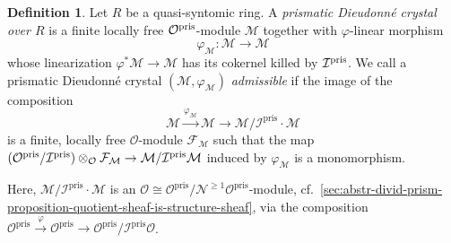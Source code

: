 \documentclass{amsart}
\theoremstyle{plain}
\theoremstyle{definition}
\newtheorem{definition}[theorem]{Definition}
\newcommand{\pris}{\mathrm{pris}}
\newcommand{\red}[1]{{\color{black} #1}}
\begin{document}
\begin{definition}
  \label{sec:abstr-divid-prism-definition-prismatic-dieudonne-crystals}
  Let $R$ be a quasi-syntomic ring. A \textit{prismatic Dieudonn\'e crystal over $R$} is a finite locally free $\mathcal{O}^{\rm pris}$-module $\mathcal{M}$ together with $\varphi$-linear morphism
  $$
  \varphi_{\mathcal{M}} \colon  \mathcal{M}\to \mathcal{M}
  $$
  whose linearization \red{$\varphi^\ast \mathcal{M}\to \mathcal{M}$} has its cokernel killed by $\mathcal{I}^{\rm pris}$. \red{We call a prismatic Dieudonn\'e crystal $(\mathcal{M},\varphi_{\mathcal{M}})$ \textit{admissible} if the image of the composition
    \[
      \mathcal{M}\xrightarrow{\varphi_{\mathcal{M}}} \mathcal{M}\to \mathcal{M}/\mathcal{I}^\pris\cdot \mathcal{M}
    \]
    is a finite, locally free $\mathcal{O}$-module $\mathcal{F}_{\mathcal{M}}$ such that the map $(\mathcal{O}^{\rm pris}/\mathcal{I}^{\rm pris}) \otimes_{\mathcal{O}} \mathcal{F}_{\mathcal{M}} \to \mathcal{M}/\mathcal{I}^{\rm pris}\mathcal{M}$ induced by $\varphi_{\mathcal{M}}$ is a monomorphism}.
\end{definition}

Here, $\mathcal{M}/\mathcal{I}^\pris\cdot \mathcal{M}$ is an $\mathcal{O}\cong \mathcal{O}^\pris/\mathcal{N}^{\geq 1}\mathcal{O}^\pris$-module, cf.\ \ref{sec:abstr-divid-prism-proposition-quotient-sheaf-is-structure-sheaf}, via the composition $\mathcal{O}^\pris\xrightarrow{\varphi}\mathcal{O}^\pris\to \mathcal{O}^\pris/\mathcal{I}^\pris\mathcal{O}$.

%
% 
\end{document}

